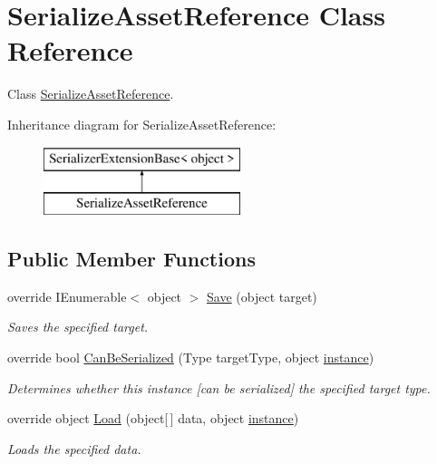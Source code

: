 \hypertarget{class_serialize_asset_reference}{}\section{Serialize\+Asset\+Reference Class Reference}
\label{class_serialize_asset_reference}


Class \hyperlink{class_serialize_asset_reference}{Serialize\+Asset\+Reference}.  


Inheritance diagram for Serialize\+Asset\+Reference\+:\begin{figure}[H]
\begin{center}
\leavevmode
\includegraphics[height=2.000000cm]{class_serialize_asset_reference}
\end{center}
\end{figure}
\subsection*{Public Member Functions}
\begin{DoxyCompactItemize}
\item 
override I\+Enumerable$<$ object $>$ \hyperlink{class_serialize_asset_reference_af5e17876467e84231b3c7925871b1978}{Save} (object target)
\begin{DoxyCompactList}\small\item\em Saves the specified target. \end{DoxyCompactList}\item 
override bool \hyperlink{class_serialize_asset_reference_a5ea84d0ce141e942750d2b4d33e89d08}{Can\+Be\+Serialized} (Type target\+Type, object \hyperlink{class_serialize_asset_reference_ad34320b9b2fc2e39a5c4e8addb07e5ec}{instance})
\begin{DoxyCompactList}\small\item\em Determines whether this instance \mbox{[}can be serialized\mbox{]} the specified target type. \end{DoxyCompactList}\item 
override object \hyperlink{class_serialize_asset_reference_ab37514eab05ceebd554e33646c8e058a}{Load} (object\mbox{[}$\,$\mbox{]} data, object \hyperlink{class_serialize_asset_reference_ad34320b9b2fc2e39a5c4e8addb07e5ec}{instance})
\begin{DoxyCompactList}\small\item\em Loads the specified data. \end{DoxyCompactList}\end{DoxyCompactItemize}
